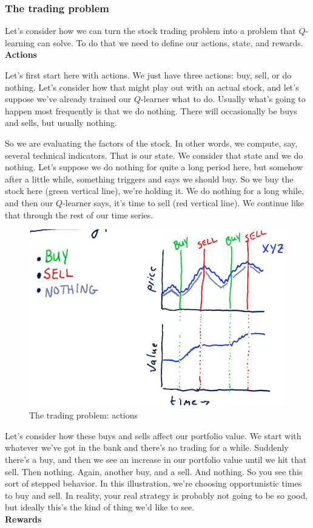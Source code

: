 \documentclass[12pt]{article}
\begin{document}
\subsubsection{The trading problem}

Let's consider how we can turn the stock trading problem into a problem that $Q$-learning can solve. To do that we need to define our actions, state, and rewards. \\[8pt]
\noindent
\textbf{Actions}

Let's first start here with actions. We just have three actions: buy, sell, or do nothing. Let's consider how that might play out with an actual stock, and let's suppose we've already trained our $Q$-learner what to do. Usually what's going to happen most frequently is that we do nothing. There will occasionally be buys and sells, but usually nothing. 

So we are evaluating the factors of the stock. In other words, we compute, say, several technical indicators. That is our state. We consider that state and we do nothing. Let's suppose we do nothing for quite a long period here, but somehow after a little while, something triggers and says we should buy. So we buy the stock here (green vertical line), we're holding it. We do nothing for a long while, and then our $Q$-learner says, it's time to sell (red vertical line). We continue like that through the rest of our time series. 

\begin{figure}[!ht]
\centering
\includegraphics[scale=0.45]{fig/fig108}
\caption{The trading problem: actions}
\end{figure}

Let's consider how these buys and sells affect our portfolio value. We start with whatever we've got in the bank and there's no trading for a while. Suddenly there's a buy, and then we see an increase in our portfolio value until we hit that sell. Then nothing. Again, another buy, and a sell. And nothing. So you see this sort of stepped behavior. In this illustration, we're choosing opportunistic times to buy and sell.  In reality, your real strategy is probably not going to be so good, but ideally this's the kind of thing we'd like to see.  \\[8pt]
\noindent
\textbf{Rewards}
\end{document}
